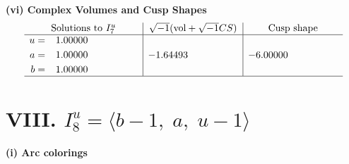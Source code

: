 \documentclass[1p]{elsarticle_modified}
\theoremstyle{definition}
\newcommand{\I}{\sqrt{-1}}
\begin{document}
\newpage\flushleft \textbf{(vi) Complex Volumes and Cusp Shapes}
$$\begin{array}{c|c|c}  
\text{Solutions to }I^u_{7}& \I (\text{vol} + \sqrt{-1}CS) & \text{Cusp shape}\\
 \hline 
\begin{aligned}
u &= \phantom{-}1.00000\phantom{ +0.000000I} \\
a &= \phantom{-}1.00000\phantom{ +0.000000I} \\
b &= \phantom{-}1.00000\phantom{ +0.000000I}\end{aligned}
 & -1.64493\phantom{ +0.000000I} & -6.00000\phantom{ +0.000000I}\\
 \hline 
 \end{array}$$\newpage\newpage\renewcommand{\arraystretch}{1}
\centering \section*{VIII. $I^u_{8}= \langle b-1,\;a,\;u-1 \rangle$}
\flushleft \textbf{(i) Arc colorings}\\
\end{document}
